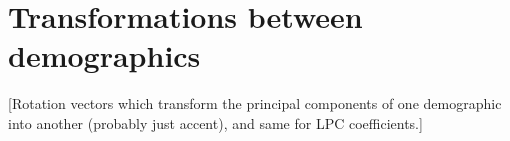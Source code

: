 \section{Transformations between demographics}

[Rotation vectors which transform the principal components of one demographic into another (probably just accent), and same for LPC coefficients.]